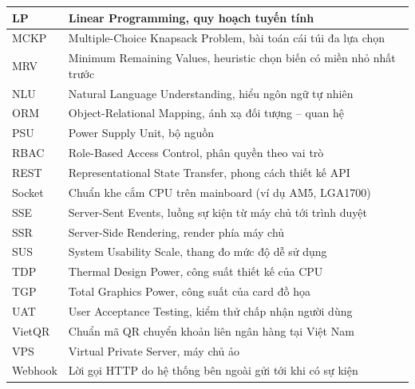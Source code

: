 \begin{center}
\begin{longtable}{|L{3.4cm}|L{10.6cm}|}
LP & Linear Programming, quy hoạch tuyến tính \\ \hline
MCKP & Multiple-Choice Knapsack Problem, bài toán cái túi đa lựa chọn \\ \hline
MRV & Minimum Remaining Values, heuristic chọn biến có miền nhỏ nhất trước \\ \hline
NLU & Natural Language Understanding, hiểu ngôn ngữ tự nhiên \\ \hline
ORM & Object-Relational Mapping, ánh xạ đối tượng -- quan hệ \\ \hline
PSU & Power Supply Unit, bộ nguồn \\ \hline
RBAC & Role-Based Access Control, phân quyền theo vai trò \\ \hline
REST & Representational State Transfer, phong cách thiết kế API \\ \hline
Socket & Chuẩn khe cắm CPU trên mainboard (ví dụ AM5, LGA1700) \\ \hline
SSE & Server-Sent Events, luồng sự kiện từ máy chủ tới trình duyệt \\ \hline
SSR & Server-Side Rendering, render phía máy chủ \\ \hline
SUS & System Usability Scale, thang đo mức độ dễ sử dụng \\ \hline
TDP & Thermal Design Power, công suất thiết kế của CPU \\ \hline
TGP & Total Graphics Power, công suất của card đồ họa \\ \hline
UAT & User Acceptance Testing, kiểm thử chấp nhận người dùng \\ \hline
VietQR & Chuẩn mã QR chuyển khoản liên ngân hàng tại Việt Nam \\ \hline
VPS & Virtual Private Server, máy chủ ảo \\ \hline
Webhook & Lời gọi HTTP do hệ thống bên ngoài gửi tới khi có sự kiện \\ \hline
\end{longtable}
\end{center}
